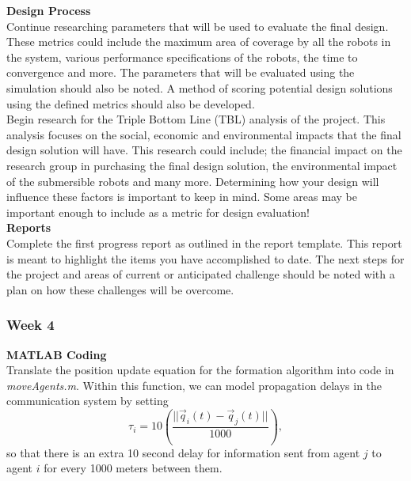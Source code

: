 \documentclass[../CourseManual.tex]{subfiles}
\begin{document}
\textbf{Design Process} \\
Continue researching parameters that will be used to evaluate the final design. These metrics could include the maximum area of coverage by all the robots in the system, various performance specifications of the robots, the time to convergence and more. The parameters that will be evaluated using the simulation should also be noted. A method of scoring potential design solutions using the defined metrics should also be developed.\\ 

Begin research for the Triple Bottom Line (TBL) analysis of the project. This analysis focuses on the  social, economic and environmental impacts that the final design solution will have. This research could include; the financial impact on the research group in purchasing the final design solution,  the environmental impact of the submersible robots and many more. Determining how your design will influence these factors is important to keep in mind. Some areas may be important enough to include as a metric for design evaluation! \\

\textbf{Reports}\\
Complete the first progress report as outlined in the report template. This report is meant to highlight the items you have accomplished to date. The next steps for the project and areas of current or anticipated challenge should be noted with a plan on how these challenges will be overcome.

\subsubsection{Week 4} \label{Week 4: Formation}
\textbf{MATLAB Coding}\\
Translate the position update equation for the formation algorithm into code in \textit{moveAgents.m}. Within this function, we can model propagation delays in the communication system by setting
\[
\tau_i = 10\left( \frac{||\vec{q}_i(t) - \vec{q}_j(t)||}{1000} \right), 
\]
so that there is an extra 10 second delay for information sent from agent $j$ to agent $i$ for every 1000 meters between them. \\

\end{document}
